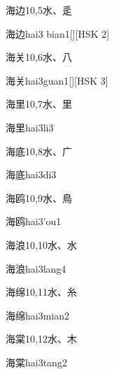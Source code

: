 \begin{entry}{海边}{10,5}{⽔、⾡}
  \begin{phonetics}{海边}{hai3 bian1}[][HSK 2]
  \end{phonetics}
\end{entry}

\begin{entry}{海关}{10,6}{⽔、⼋}
  \begin{phonetics}{海关}{hai3guan1}[][HSK 3]
  \end{phonetics}
\end{entry}

\begin{entry}{海里}{10,7}{⽔、⾥}
  \begin{phonetics}{海里}{hai3li3}
  \end{phonetics}
\end{entry}

\begin{entry}{海底}{10,8}{⽔、⼴}
  \begin{phonetics}{海底}{hai3di3}
  \end{phonetics}
\end{entry}

\begin{entry}{海鸥}{10,9}{⽔、⿃}
  \begin{phonetics}{海鸥}{hai3'ou1}
  \end{phonetics}
\end{entry}

\begin{entry}{海浪}{10,10}{⽔、⽔}
  \begin{phonetics}{海浪}{hai3lang4}
  \end{phonetics}
\end{entry}

\begin{entry}{海绵}{10,11}{⽔、⽷}
  \begin{phonetics}{海绵}{hai3mian2}
  \end{phonetics}
\end{entry}

\begin{entry}{海棠}{10,12}{⽔、⽊}
  \begin{phonetics}{海棠}{hai3tang2}
  \end{phonetics}
\end{entry}


